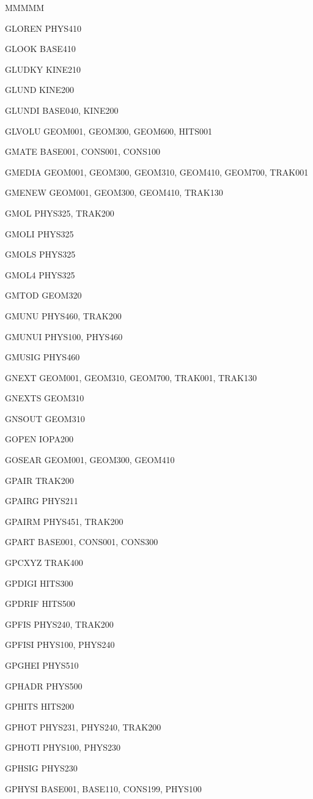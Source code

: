 {\begin{DL}{MMMMM}
\item[GLOREN]PHYS410
\item[GLOOK ]BASE410
\item[GLUDKY]KINE210
\item[GLUND] KINE200
\item[GLUNDI]BASE040, KINE200
\item[GLVOLU]GEOM001, GEOM300, GEOM600, HITS001
\item[GMATE ]BASE001, CONS001, CONS100
\item[GMEDIA]GEOM001, GEOM300, GEOM310, GEOM410, GEOM700, TRAK001
\item[GMENEW]GEOM001, GEOM300, GEOM410, TRAK130
\item[GMOL  ]PHYS325, TRAK200
\item[GMOLI ]PHYS325
\item[GMOLS ]PHYS325
\item[GMOL4 ]PHYS325
\item[GMTOD ]GEOM320
\item[GMUNU ]PHYS460, TRAK200
\item[GMUNUI]PHYS100, PHYS460
\item[GMUSIG]PHYS460
\item[GNEXT ]GEOM001, GEOM310, GEOM700, TRAK001, TRAK130
\item[GNEXTS]GEOM310
\item[GNSOUT]GEOM310
\item[GOPEN ]IOPA200
\item[GOSEAR]GEOM001, GEOM300, GEOM410
\item[GPAIR ]TRAK200
\item[GPAIRG]PHYS211
\item[GPAIRM]PHYS451, TRAK200
\item[GPART ]BASE001, CONS001, CONS300
\item[GPCXYZ]TRAK400
\item[GPDIGI]HITS300
\item[GPDRIF]HITS500
\item[GPFIS ]PHYS240, TRAK200
\item[GPFISI]PHYS100, PHYS240
\item[GPGHEI]PHYS510
\item[GPHADR]PHYS500
\item[GPHITS]HITS200
\item[GPHOT ]PHYS231, PHYS240, TRAK200
\item[GPHOTI]PHYS100, PHYS230
\item[GPHSIG]PHYS230
\item[GPHYSI]BASE001, BASE110, CONS199, PHYS100

\end{DL}}

